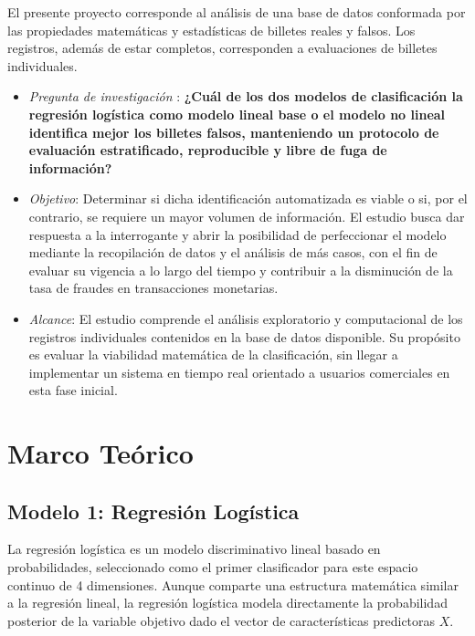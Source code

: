 \documentclass[conference]{IEEEtran}
\begin{document}
	El presente proyecto corresponde al análisis de una base de datos conformada por las propiedades matemáticas y estadísticas de billetes reales y falsos. Los registros, además de estar completos, corresponden a evaluaciones de billetes individuales.\\
	
	\begin{itemize}
		\item \textit{Pregunta de investigación }: \textbf{¿Cuál de los dos modelos de clasificación la regresión logística como modelo lineal base o el modelo no lineal identifica mejor los billetes falsos, manteniendo un protocolo de evaluación estratificado, reproducible y libre de fuga de información?}\\
		\item \textit{Objetivo}: Determinar si dicha identificación automatizada es viable o si, por el contrario, se requiere un mayor volumen de información. El estudio busca dar respuesta a la interrogante y abrir la posibilidad de perfeccionar el modelo mediante la recopilación de datos y el análisis de más casos, con el fin de evaluar su vigencia a lo largo del tiempo y contribuir a la disminución de la tasa de fraudes en transacciones monetarias.\\
		\item\textit{ Alcance}: El estudio comprende el análisis exploratorio y computacional de los registros individuales contenidos en la base de datos disponible. Su propósito es evaluar la viabilidad matemática de la clasificación, sin llegar a implementar un sistema en tiempo real orientado a usuarios comerciales en esta fase inicial.
	\end{itemize}
	
	
	
	\section{Marco Teórico}
	\subsection{Modelo 1: Regresión Logística}
	
	La regresión logística es un modelo discriminativo lineal basado en probabilidades, seleccionado como el primer clasificador para este espacio continuo de 4 dimensiones\cite{aws_logistic_regression}. Aunque comparte una estructura matemática similar a la regresión lineal, la regresión logística modela directamente la probabilidad posterior de la variable objetivo dado el vector de características predictoras $X$.
	
\end{document}
